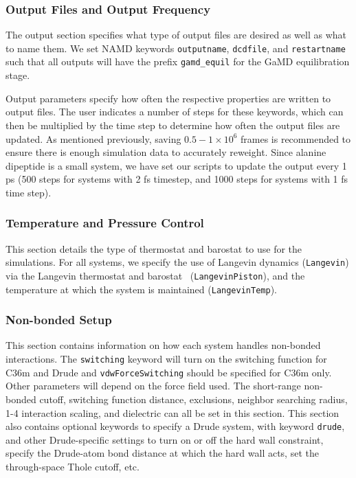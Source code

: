 \documentclass[9pt,tutorial]{livecoms}
\begin{document}
\subsubsection{Output Files and Output Frequency}
The output section specifies what type of output files are desired as well as what to name them. We set NAMD keywords \texttt{outputname}, \texttt{dcdfile}, and \texttt{restartname} such that all outputs will have the prefix \texttt{gamd\_equil} for the GaMD equilibration stage. 

Output parameters specify how often the respective properties are written to output files. The user indicates a number of steps for these keywords, which can then be multiplied by the time step to determine how often the output files are updated. As mentioned previously, saving $0.5 - 1 \times 10^6$ frames is recommended to ensure there is enough simulation data to accurately reweight. Since alanine dipeptide is a small system, we have set our scripts to update the output every 1 ps (500 steps for systems with 2 fs timestep, and 1000 steps for systems with 1 fs time step). 

\subsubsection{Temperature and Pressure Control}
This section details the type of thermostat and barostat to use for the simulations. For all systems, we specify the use of Langevin dynamics (\texttt{Langevin}) via the Langevin thermostat and barostat~\cite{feller_langevinpiston_1995} (\texttt{LangevinPiston}), and the temperature at which the system is maintained (\texttt{LangevinTemp}).

\subsubsection{Non-bonded Setup}
This section contains information on how each system handles non-bonded interactions. The \texttt{switching} keyword will turn on the switching function for C36m and Drude and \texttt{vdwForceSwitching} should be specified for C36m only. Other parameters will depend on the force field used. The short-range non-bonded cutoff, switching function distance, exclusions, neighbor searching radius, 1-4 interaction scaling, and dielectric can all be set in this section. This section also contains optional keywords to specify a Drude system, with keyword \texttt{drude}, and other Drude-specific settings to turn on or off the hard wall constraint, specify the Drude-atom bond distance at which the hard wall acts, set the through-space Thole cutoff, etc. 
\end{document}
